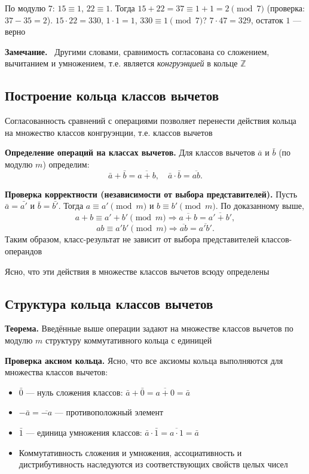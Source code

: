 \documentclass[a4paper,12pt]{article}
\newcommand{\myremark}{\textbf{Замечание.}\ }
\theoremstyle{definition}
\theoremstyle{plain}
\theoremstyle{remark}
\begin{document}
	\begin{tcolorbox}[colback=blue!5, colframe=blue!40!black, title=Пример]
		По модулю $7$: $15 \equiv 1$, $22 \equiv 1$. Тогда $15+22 = 37 \equiv 1+1 = 2 \pmod{7}$ (проверка: $37-35=2$). $15 \cdot 22 = 330$, $1 \cdot 1 = 1$, $330 \equiv 1 \pmod{7}$? $7 \cdot 47 = 329$, остаток $1$ — верно
	\end{tcolorbox}
	
	\myremark
	Другими словами, сравнимость согласована со сложением, вычитанием и умножением, т.е. является \textit{конгруэнцией} в кольце $\mathbb{Z}$
	
	\subsection{Построение кольца классов вычетов}
	
	Согласованность сравнений с операциями позволяет перенести действия кольца на множество классов конгруэнции, т.е. классов вычетов
	
	\noindent \textbf{Определение операций на классах вычетов.}
	Для классов вычетов $\bar{a}$ и $\bar{b}$ (по модулю $m$) определим:
	\[
	\bar{a} + \bar{b} = \overline{a + b}, \quad \bar{a} \cdot \bar{b} = \overline{ab}.
	\]
	
	\noindent \textbf{Проверка корректности (независимости от выбора представителей).}
	Пусть $\bar{a} = \bar{a'}$ и $\bar{b} = \bar{b'}$. Тогда $a \equiv a' \pmod{m}$ и $b \equiv b' \pmod{m}$. По доказанному выше,
	\[
	a + b \equiv a' + b' \pmod{m} \Rightarrow \overline{a + b} = \overline{a' + b'},
	\]
	\[
	ab \equiv a'b' \pmod{m} \Rightarrow \overline{ab} = \overline{a'b'}.
	\]
	Таким образом, класс-результат не зависит от выбора представителей классов-операндов
	
	Ясно, что эти действия в множестве классов вычетов всюду определены
	
	\subsection{Структура кольца классов вычетов}
	
	\noindent \textbf{Теорема.}
	Введённые выше операции задают на множестве классов вычетов по модулю $m$ структуру коммутативного кольца с единицей
	
	\medskip
	\noindent \textbf{Проверка аксиом кольца.}
	Ясно, что все аксиомы кольца выполняются для множества классов вычетов:
	\begin{itemize}
		\item $\bar{0}$ — нуль сложения классов: $\bar{a} + \bar{0} = \overline{a+0} = \bar{a}$
		\item $-\bar{a} = \overline{-a}$ — противоположный элемент
		\item $\bar{1}$ — единица умножения классов: $\bar{a} \cdot \bar{1} = \overline{a \cdot 1} = \bar{a}$
		\item Коммутативность сложения и умножения, ассоциативность и дистрибутивность наследуются из соответствующих свойств целых чисел
	\end{itemize}
	
\end{document}
